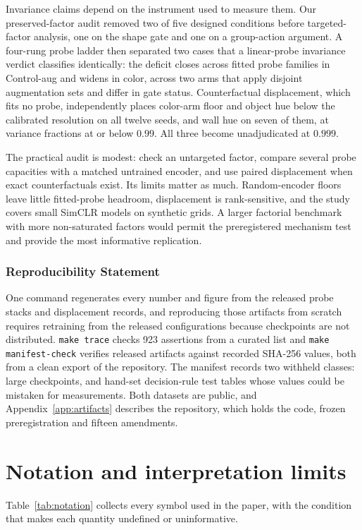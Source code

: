 \documentclass[10pt]{article}
\begin{document}
Invariance claims depend on the instrument used to measure them. Our preserved-factor audit removed two of five designed
conditions before targeted-factor analysis, one on the shape gate and one on a group-action
argument. A four-rung probe ladder
then separated two cases that a linear-probe invariance verdict classifies identically: the deficit
closes across fitted probe families in Control-aug and widens in color, across two arms that apply
disjoint augmentation sets and differ in gate status. Counterfactual displacement, which fits no probe, independently places color-arm floor
and object hue below the calibrated resolution on all twelve seeds, and wall hue on seven of them,
at variance fractions at or below $0.99$. All three become unadjudicated at $0.999$.

The practical audit is modest: check an untargeted factor, compare several probe
capacities with a matched untrained encoder, and use paired displacement when exact counterfactuals
exist. Its limits matter as much. Random-encoder floors leave little fitted-probe headroom,
displacement is rank-sensitive, and the study covers small SimCLR models on synthetic grids. A larger factorial
benchmark with more non-saturated factors would permit the preregistered mechanism test and provide
the most informative replication.


\subsubsection*{Reproducibility Statement} One command regenerates every number and
figure from the released probe stacks and displacement records, and reproducing those artifacts from
scratch requires retraining from the released configurations because checkpoints are not
distributed. \texttt{make trace} checks 923 assertions from a curated list and \texttt{make
manifest-check} verifies released artifacts against recorded SHA-256 values, both from a clean
export of the repository. The manifest records two withheld classes: large checkpoints, and hand-set
decision-rule test tables whose values could be mistaken for measurements. Both datasets are public,
and Appendix~\ref{app:artifacts} describes the repository, which holds the code, frozen
preregistration and fifteen amendments.





\appendix
\section{Notation and interpretation limits}
\label{app:notation}
Table~\ref{tab:notation} collects every symbol used in the paper, with the condition that makes each
quantity undefined or uninformative.
\end{document}
